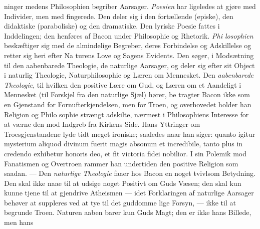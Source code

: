 \documentclass[12pt,a4paper]{book}
\begin{document}
ninger medens Philosophien begriber Aarsager. \emph{Poesien} har
ligeledes at gjøre med Individer, men med fingerede. Den
deler sig i den fortællende (episke), den didaktiske (paraboliske)
og den dramatiske. Den lyriske Poesie fattes i Inddelingen;
den henføres af Bacon under Philosophie og Rhetorik. \emph{Phi\-%
losophien} beskæftiger sig med de almindelige Begreber,
deres Forbindelse og Adskillelse og retter sig heri efter Na\-%
turens Love og Sagens Evidents. Den søger, i Modsætning
til den aabenbarede Theologie, de naturlige Aarsager, og deler
sig efter sit Object i naturlig Theologie, Naturphilosophie og
Læren om Mennesket. Den \emph{aabenbarede Theologie}, til
hvilken den positive Lære om Gud, og Læren om et Aandeligt
i Mennesket (til Forskjel fra den naturlige Sjæl) hører, be\-%
tragter Bacon ikke som en Gjenstand for Fornufterkjendelsen,
men for Troen, og overhovedet holder han Religion og Philo\-%
sophie strængt adskilte, nærmest i Philosophiens Interesse for
at værne den mod Indgreb fra Kirkens Side. Hans Yttringer
om Troesgjenstandene lyde tidt meget ironiske; saaledes naar
han siger: quanto igitur mysterium aliquod divinum fuerit
magis absonum et incredibile, tanto plus in credendo exhibetur
honoris deo, et fit victoria fidei nobilior. I sin Polemik mod
Fanatismen og Overtroen rammer han undertiden den positive
Religion som saadan. --- Den \emph{naturlige Theologie} faaer hos
Bacon en noget tvivlsom Betydning. Den skal ikke naae til at
udsige noget Positivt om Guds Væsen; den skal kun kunne tjene
til at gjendrive Atheismen --- idet Forklaringen af naturlige
Aarsager behøver at suppleres ved at tye til det guddomme\-%
lige Forsyn, --- ikke til at begrunde Troen. Naturen aaben\-%
barer kun Guds Magt; den er ikke hans Billede, men hans
\end{document}
